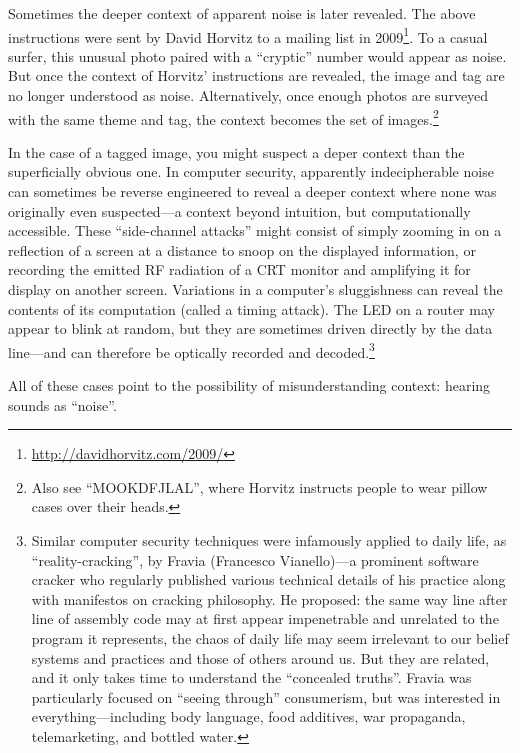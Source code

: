\documentclass{thesis}
\begin{document}
Sometimes the deeper context of apparent noise is later revealed. The above instructions were sent by David Horvitz to a mailing list in 2009\footnote{\url{http://davidhorvitz.com/2009/}}. To a casual surfer, this unusual photo paired with a ``cryptic'' number\cite{david_horvitz_flickr:_????-1} would appear as noise. But once the context of Horvitz' instructions are revealed, the image and tag are no longer understood as noise. Alternatively, once enough photos are surveyed with the same theme and tag, the context becomes the set of images.\footnote{Also see ``MOOKDFJLAL''\cite{david_horvitz_flickr:_????}, where Horvitz instructs people to wear pillow cases over their heads.}

In the case of a tagged image, you might suspect a deper context than the superficially obvious one. In computer security, apparently indecipherable noise can sometimes be reverse engineered to reveal a deeper context where none was originally even suspected---a context beyond intuition, but computationally accessible. These ``side-channel attacks'' might consist of simply zooming in on a reflection of a screen at a distance to snoop on the displayed information,\cite{w._wayt_gibbs_hackers_2009} or recording the emitted RF radiation of a CRT monitor and amplifying it for display on another screen.\cite{erik_thiele_tempest_????} Variations in a computer's sluggishness can reveal the contents of its computation (called a timing attack). The LED on a router may appear to blink at random, but they are sometimes driven directly by the data line---and can therefore be optically recorded and decoded.\footnote{Similar computer security techniques were infamously applied to daily life, as ``reality-cracking''\cite{francesco_vianello_reality_????}, by Fravia (Francesco Vianello)---a prominent software cracker who regularly published various technical details of his practice along with manifestos on cracking philosophy. He proposed: the same way line after line of assembly code may at first appear impenetrable and unrelated to the program it represents, the chaos of daily life may seem irrelevant to our belief systems and practices and those of others around us. But they are related, and it only takes time to understand the ``concealed truths''. Fravia was particularly focused on ``seeing through'' consumerism, but was interested in everything---including body language, food additives, war propaganda, telemarketing, and bottled water.}

All of these cases point to the possibility of misunderstanding context: hearing sounds as ``noise''.
\end{document}
